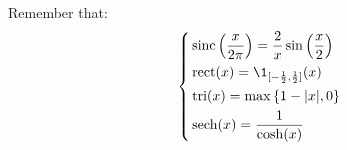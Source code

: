 \documentclass[../complete.tex]{subfiles}
\begin{document}
\baselineskip
Remember that:
\begin{equation}
	\left\{\begin{aligned}
		&\sinc\left( \frac{x}{2\pi} \right)=\frac{2}{x}\sin\left( \frac{x}{2} \right)\\
		&\rect(x)=\1_{[-\frac{1}{2},\frac{1}{2}]}(x)\\
		&\tri(x)=\max\left\{ 1-\abs{x},0 \right\}\\
		&\sech(x)=\frac{1}{\cosh(x)}
	\end{aligned}\right.
\end{equation}
\end{document}
